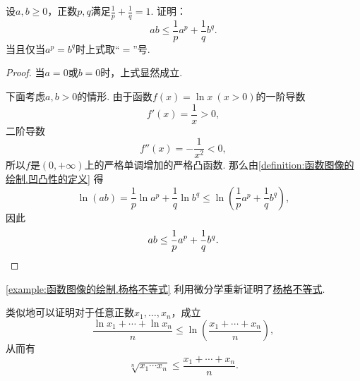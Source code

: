 \begin{example}[杨格不等式]\label{example:函数图像的绘制.杨格不等式}
设\(a,b\geq0\)，正数\(p,q\)满足\(\frac1p+\frac1q=1\).
证明：\begin{equation*}
	a b \leq \frac1p a^p + \frac1q b^q.
\end{equation*}
当且仅当\(a^p = b^q\)时上式取“\(=\)”号.
\begin{proof}
当\(a=0\)或\(b=0\)时，上式显然成立.

下面考虑\(a,b>0\)的情形.
由于函数\(f(x) = \ln x\ (x>0)\)的一阶导数\begin{equation*}
	f'(x) = \frac1x > 0,
\end{equation*}
二阶导数\begin{equation*}
	f''(x) = -\frac1{x^2} < 0,
\end{equation*}
所以\(f\)是\((0,+\infty)\)上的严格单调增加的严格凸函数.
那么由\cref{definition:函数图像的绘制.凹凸性的定义} 得\begin{equation*}
	\ln(ab) = \frac1p \ln a^p + \frac1q \ln b^q
	\leq \ln\left( \frac1p a^p + \frac1q b^q \right),
\end{equation*}
因此\begin{equation*}
	ab \leq \frac1p a^p + \frac1q b^q.
	\qedhere
\end{equation*}
\end{proof}
\end{example}
\begin{remark}
\cref{example:函数图像的绘制.杨格不等式}
利用微分学重新证明了\hyperref[theorem:不等式.杨格不等式]{杨格不等式}.
\end{remark}
\begin{remark}
类似地可以证明对于任意正数\(x_1,\dotsc,x_n\)，成立\begin{equation*}
	\frac{\ln x_1 + \dotsb + \ln x_n}{n}
	\leq \ln\left( \frac{x_1 + \dotsb + x_n}{n} \right),
\end{equation*}
从而有\begin{equation*}
	\sqrt[n]{x_1 \dotsm x_n}
	\leq \frac{x_1 + \dotsb + x_n}{n}.
\end{equation*}
\end{remark}

